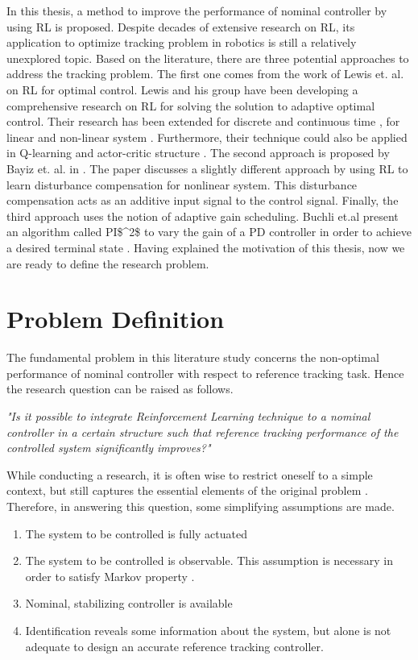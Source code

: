 In this thesis, a method to improve the performance of nominal controller by using \ac{RL} is proposed. Despite decades of extensive research on \ac{RL}, its application to optimize tracking problem in robotics is still a relatively unexplored topic. Based on the literature, there are three potential approaches to address the tracking problem. The first one comes from the work of Lewis et. al. on \ac{RL} for optimal control. Lewis and his group have been developing a comprehensive research on \ac{RL} for solving the solution to adaptive optimal control. Their research has been extended for discrete \cite{Kiumarsi20141167} and continuous time \cite{Modares6760477}, for linear \cite{Kiumarsi6760476} and non-linear system \cite{Kiumarsi6918527}. Furthermore, their technique could also be applied in Q-learning \cite{Kiumarsi20141167} and actor-critic structure \cite{Kiumarsi6918527}. The second approach is proposed by Bayiz et. al. in \cite{Efe2014}. The paper discusses a slightly different approach by using \ac{RL} to learn disturbance compensation for nonlinear system. This disturbance compensation acts as an additive input signal to the control signal. Finally, the third approach uses the notion of adaptive gain scheduling. Buchli et.al present an algorithm called \ac{PI$^2$} to vary the gain of a \ac{PD} controller in order to achieve a desired terminal state \cite{Buchli2010} \cite{Buchli6037312}. Having explained the motivation of this thesis, now we are ready to define the research problem.



\section{Problem Definition}
The fundamental problem in this literature study concerns the non-optimal performance of nominal controller with respect to reference tracking task. Hence the research question can be raised as follows.

\textit{"Is it possible to integrate Reinforcement Learning technique to a nominal controller in a certain structure such that reference tracking performance of the controlled system significantly improves?"}

While conducting a research, it is often wise to restrict oneself to a simple context, but still captures the essential elements of the original problem \cite{einstein}. Therefore, in answering this question, some simplifying assumptions are made.

\begin{enumerate}
	\item The system to be controlled is fully actuated
	\item The system to be controlled is observable. This assumption is necessary in order to satisfy Markov property \cite{sutton1998reinforcement}.
	\item Nominal, stabilizing controller is available	
	\item Identification reveals some information about the system, but alone is not adequate to design an accurate reference tracking controller.
\end{enumerate}

